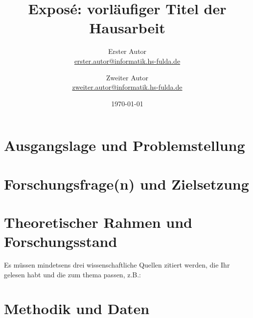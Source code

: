\documentclass[11pt,a4paper]{article}
\title{Exposé: vorläufiger Titel der Hausarbeit} %
\author{%
\large Erster Autor \\ %
\normalsize \href{mailto:erster.autor@informatik.hs-fulda.de}{erster.autor@informatik.hs-fulda.de}
\and
\large Zweiter Autor \\ %
\normalsize \href{mailto:zweiter.autor@informatik.hs-fulda.de}{zweiter.autor@informatik.hs-fulda.de}
}
\date{\today} %
\begin{document}
\maketitle



\section{Ausgangslage und Problemstellung}

\section{Forschungsfrage(n) und Zielsetzung}

\section{Theoretischer Rahmen und Forschungsstand}
Es müssen mindetsens drei wissenschaftliche Quellen zitiert werden, die Ihr gelesen habt und die zum thema passen, z.B.:
\cite{henning2007taschenbuch}

\section{Methodik und Daten}
\end{document}
